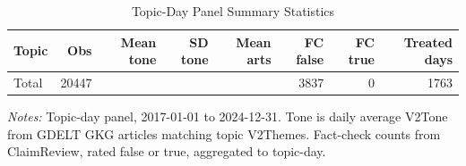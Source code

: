 \begin{table}[htbp]\centering
\caption{Topic-Day Panel Summary Statistics}\label{tab:desc}
\begin{tabular}{lrrrrrrr}\toprule
Topic & Obs & Mean tone & SD tone & Mean arts & FC false & FC true & Treated days \\
\midrule
\midrule
Total & 20447 & & & & 3837 & 0 & 1763 \\
\bottomrule\end{tabular}
\footnotesize\emph{Notes:} Topic-day panel, 2017-01-01 to 2024-12-31. Tone is daily average V2Tone from GDELT GKG articles matching topic V2Themes. Fact-check counts from ClaimReview, rated false or true, aggregated to topic-day.
\end{table}
